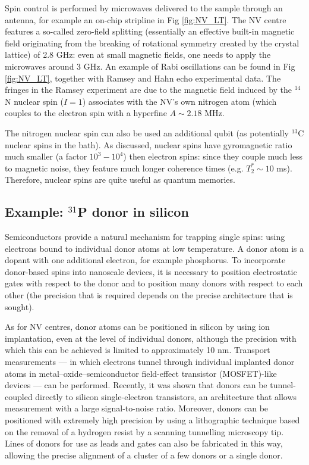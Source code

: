 \documentclass[a4paper,11pt]{article}
\begin{document}
Spin control is performed by microwaves delivered to the sample through an antenna, for example an on-chip stripline in Fig \ref{fig:NV_LT}. The NV centre features a so-called zero-field splitting (essentially an effective built-in magnetic field originating from the breaking of rotational symmetry created by the crystal lattice) of 2.8 GHz: even at small magnetic fields, one needs to apply the microwaves around 3 GHz. An example of Rabi oscillations can be found in Fig \ref{fig:NV_LT}, together with Ramsey and Hahn echo experimental data. The fringes in the Ramsey experiment are due to the magnetic field induced by the $^{14}$N nuclear spin ($I=1$) associates with the NV's own nitrogen atom (which couples to the electron spin with a hyperfine $A \sim 2.18$ MHz.

The nitrogen nuclear spin can also be used an additional qubit (as potentially $^{13}$C nuclear spins in the bath). As discussed, nuclear spins have gyromagnetic ratio much smaller (a factor $10^3-10^4$) then electron spins: since they couple much less to magnetic noise, they feature much longer coherence times (e.g. $T_2^* \sim 10$ ms). Therefore, nuclear spins are quite useful as quantum memories.

\subsection {Example: $^{31}$P donor in silicon}
Semiconductors provide a natural mechanism for trapping single spins: using electrons bound to individual donor atoms at low temperature. A donor atom is a dopant with one additional electron, for example phosphorus. To incorporate donor-based spins into nanoscale devices, it is necessary to position electrostatic gates with respect to the donor and to position many donors with respect to each other (the precision that is required depends on the precise architecture that is sought).

As for NV centres, donor atoms can be positioned in silicon by using ion implantation, even at the level of individual donors, although the precision with which this can be achieved is limited to approximately 10 nm. Transport measurements — in which electrons tunnel through individual implanted donor atoms in metal–oxide–semiconductor field-effect transistor (MOSFET)-like devices — can be performed. Recently, it was shown that donors can be tunnel-coupled directly to silicon single-electron transistors, an architecture that allows measurement with a large signal-to-noise ratio. Moreover, donors can be positioned with extremely high precision by using a lithographic technique based on the removal of a hydrogen resist by a scanning tunnelling microscopy tip. Lines of donors for use as leads and gates can also be fabricated in this way, allowing the precise alignment of a cluster of a few donors or a single donor.
\end{document}
